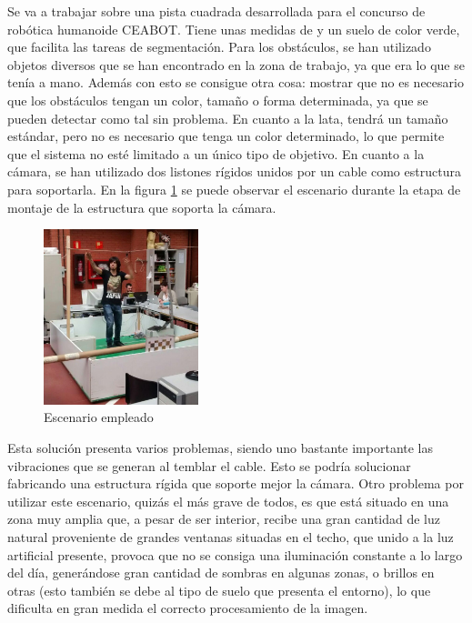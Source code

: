 Se va a trabajar sobre una pista cuadrada desarrollada para el concurso de robótica humanoide CEABOT. Tiene unas medidas de  y un suelo de color verde, que facilita las tareas de segmentación. Para los obstáculos, se han utilizado objetos diversos que se han encontrado en la zona de trabajo, ya que era lo que se tenía a mano. Además con esto se consigue otra cosa: mostrar que no es necesario que los obstáculos tengan un color, tamaño o forma determinada, ya que se pueden detectar como tal sin problema. En cuanto a la lata, tendrá un tamaño estándar, pero no es necesario que tenga un color determinado, lo que permite que el sistema no esté limitado a un único tipo de objetivo. En cuanto a la cámara, se han utilizado dos listones rígidos unidos por un cable como estructura para soportarla. En la figura \ref{fig:escenario} se puede observar el escenario durante la etapa de montaje de la estructura que soporta la cámara.\\

\begin{figure}[H]
        \centering
        \includegraphics[width=0.4\textwidth]{images/escenario.jpg}
        \caption{Escenario empleado}
        \label{fig:escenario}
\end{figure} 

Esta solución presenta varios problemas, siendo uno bastante importante las vibraciones que se generan al temblar el cable. Esto se podría solucionar fabricando una estructura rígida que soporte mejor la cámara. Otro problema por utilizar este escenario, quizás el más grave de todos, es que está situado en una zona muy amplia que, a pesar de ser interior, recibe una gran cantidad de luz natural proveniente de grandes ventanas situadas en el techo, que unido a la luz artificial presente, provoca que no se consiga una iluminación constante a lo largo del día, generándose gran cantidad de sombras en algunas zonas, o brillos en otras (esto también se debe al tipo de suelo que presenta el entorno), lo que dificulta en gran medida el correcto procesamiento de la imagen.\\  
